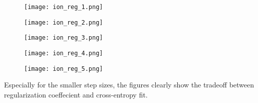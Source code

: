 \documentclass[12pt]{article}
\begin{document}
\begin{enumerate}[label=\alph*.]
	\begin{figure}[bp!]
	  \centering
	    \texttt{[image: ion\_reg\_1.png]}
	\end{figure}

	\begin{figure}[bp!]
	  \centering
	    \texttt{[image: ion\_reg\_2.png]}
	\end{figure}

	\begin{figure}[bp!]
	  \centering
	    \texttt{[image: ion\_reg\_3.png]}
	\end{figure}

	\begin{figure}[bp!]
	  \centering
	    \texttt{[image: ion\_reg\_4.png]}
	\end{figure}

	\begin{figure}[bp!]
	  \centering
	    \texttt{[image: ion\_reg\_5.png]}
	\end{figure}

	Especially for the smaller step sizes, the figures clearly show the tradeoff between regularization coeffecient and cross-entropy fit.

\end{enumerate}
\end{document}
